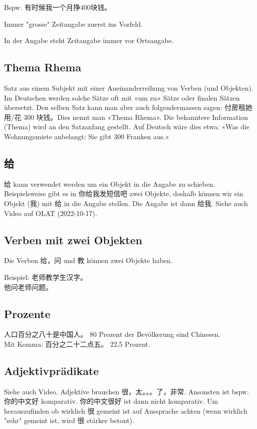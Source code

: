 \documentclass[UTF8]{ctexart}
\begin{document}
Bspw. 有时候我一个月挣400块钱。

Immer "grosse" Zeitangabe zuerst ins Vorfeld.

In der Angabe steht Zeitangabe immer vor Ortsangabe.

\subsection{Thema Rhema}

Satz aus einem Subjekt mit einer Aneinanderreihung von Verben (und Objekten). Im
Deutschen werden solche Sätze oft mit «um zu» Sätze oder finalen Sätzen übersetzt. Den
selben Satz kann man aber auch folgendermassen sagen:
付房租她用/花 300 块钱。Dies nennt man «Thema Rhema». Die bekanntere Information
(Thema) wird an den Satzanfang gestellt. Auf Deutsch wäre dies etwa: «Was die
Wohnungsmiete anbelangt: Sie gibt 300 Franken aus.»

\subsection{给}

给 kann verwendet werden um ein Objekt in die Angabe zu schieben. Beispielsweise gibt es in 你给我发短信吧 zwei Objekte, deshalb können wir ein Objekt (我) mit 给 in die Angabe stellen. Die Angabe ist dann 给我. Siehe auch Video auf OLAT (2022-10-17).

\subsection{Verben mit zwei Objekten}

Die Verben 给，问 und 教 können zwei Objekte haben.

Beispiel: 老师教学生汉字。\\
他问老师问题。

\subsection{Prozente}

人口百分之八十是中国人。 80 Prozent der Bevölkerung sind Chinesen.\\
Mit Komma: 百分之二十二点五。 22,5 Prozent.

\subsection{Adjektivprädikate}

Siehe auch Video. Adjektive brauchen 很，太。。。了，非常. Ansonsten ist bspw. 你的中文好 komparativ. 你的中文很好 ist dann nicht komparativ. Um herauszufinden ob wirklich 很 gemeint ist auf Aussprache achten (wenn wirklich "sehr" gemeint ist, wird 很 stärker betont).
\end{document}

